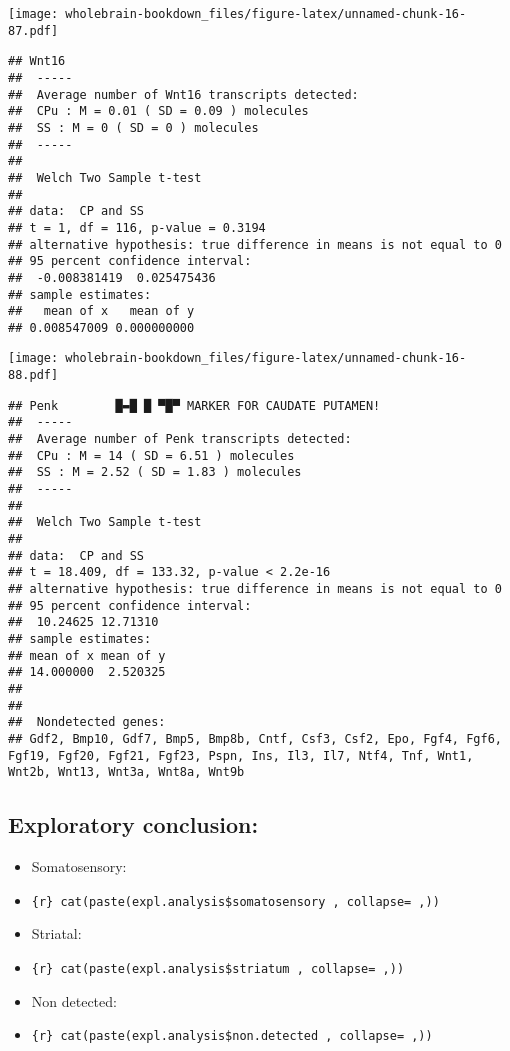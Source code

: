 \documentclass[]{book}
\providecommand{\tightlist}{%
  \setlength{\itemsep}{0pt}\setlength{\parskip}{0pt}}
\theoremstyle{definition}
\theoremstyle{definition}
\theoremstyle{remark}
\begin{document}
\texttt{[image: wholebrain-bookdown\_files/figure-latex/unnamed-chunk-16-87.pdf]}

\begin{verbatim}
## Wnt16
##  -----
##  Average number of Wnt16 transcripts detected:
##  CPu : M = 0.01 ( SD = 0.09 ) molecules 
##  SS : M = 0 ( SD = 0 ) molecules
##  -----
## 
##  Welch Two Sample t-test
## 
## data:  CP and SS
## t = 1, df = 116, p-value = 0.3194
## alternative hypothesis: true difference in means is not equal to 0
## 95 percent confidence interval:
##  -0.008381419  0.025475436
## sample estimates:
##   mean of x   mean of y 
## 0.008547009 0.000000000
\end{verbatim}

\texttt{[image: wholebrain-bookdown\_files/figure-latex/unnamed-chunk-16-88.pdf]}

\begin{verbatim}
## Penk        █▬█ █ ▀█▀ MARKER FOR CAUDATE PUTAMEN!
##  -----
##  Average number of Penk transcripts detected:
##  CPu : M = 14 ( SD = 6.51 ) molecules 
##  SS : M = 2.52 ( SD = 1.83 ) molecules
##  -----
## 
##  Welch Two Sample t-test
## 
## data:  CP and SS
## t = 18.409, df = 133.32, p-value < 2.2e-16
## alternative hypothesis: true difference in means is not equal to 0
## 95 percent confidence interval:
##  10.24625 12.71310
## sample estimates:
## mean of x mean of y 
## 14.000000  2.520325 
## 
## 
##  Nondetected genes: 
## Gdf2, Bmp10, Gdf7, Bmp5, Bmp8b, Cntf, Csf3, Csf2, Epo, Fgf4, Fgf6, Fgf19, Fgf20, Fgf21, Fgf23, Pspn, Ins, Il3, Il7, Ntf4, Tnf, Wnt1, Wnt2b, Wnt13, Wnt3a, Wnt8a, Wnt9b
\end{verbatim}

\subsection{Exploratory conclusion:}\label{exploratory-conclusion}

\begin{itemize}
\tightlist
\item
  Somatosensory:
\item
  \texttt{\{r\}\ cat(paste(expl.analysis\$somatosensory\ ,\ collapse=\textquotesingle{}\ ,\textquotesingle{}))}
\item
  Striatal:
\item
  \texttt{\{r\}\ cat(paste(expl.analysis\$striatum\ ,\ collapse=\textquotesingle{}\ ,\textquotesingle{}))}
\item
  Non detected:
\item
  \texttt{\{r\}\ cat(paste(expl.analysis\$non.detected\ ,\ collapse=\textquotesingle{}\ ,\textquotesingle{}))}
\end{itemize}
\end{document}
